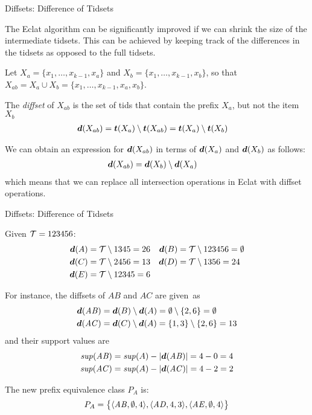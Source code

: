 \begin{frame}{Diffsets: Difference of Tidsets}

The Eclat algorithm can be
signif\/{i}cantly improved if we can shrink the size of the
intermediate tidsets. This can be achieved by keeping track of the
differences in the tidsets as opposed to the full tidsets.

\medskip
Let $X_a = \{x_1, \ldots, x_{k-1}, x_a\}$
and $X_b = \{x_1, \ldots, x_{k-1}, x_b\}$, so that
$X_{ab} = X_a \cup X_b = \{x_1, \ldots, x_{k-1}, x_a,
x_b \}$. 

\medskip
The {\em diffset} of $X_{ab}$ is the set of tids
that contain the pref\/{i}x $X_a$, but not
the item $X_b$
\begin{align*}
  {\boldsymbol d}(X_{ab}) &= {{\boldsymbol t}}(X_{a}) \setminus {{\boldsymbol t}}(X_{ab}) =
    {{\boldsymbol t}}(X_{a}) \setminus {{\boldsymbol t}}(X_{b})
\end{align*}

\medskip
We can obtain an expression for ${\boldsymbol d}(X_{ab})$ in terms of
${\boldsymbol d}(X_a)$ and ${\boldsymbol d}(X_b)$ as follows:
\begin{align*}
  {\boldsymbol d}(X_{ab}) 
    & = {\boldsymbol d}(X_b) \setminus {\boldsymbol d}(X_a)
\end{align*}
which means that we can replace all
intersection operations in Eclat with diffset operations. 

\end{frame}


\begin{frame}{Diffsets: Difference of Tidsets}

  Given ${\mathcal T} = 123456$:
  \begin{align*}
	  {\boldsymbol d}(A) & = {\mathcal T} \setminus 1345 = 26 & {\boldsymbol d}(B) & = {\mathcal T} \setminus 123456 = \emptyset\\
	  {\boldsymbol d}(C) & = {\mathcal T} \setminus 2456 = 13 & {\boldsymbol d}(D) & = {\mathcal T} \setminus 1356 = 24\\
	  {\boldsymbol d}(E) & = {\mathcal T} \setminus 12345 = 6 & & \\
  \end{align*}

  For instance, the diffsets of $\mathit{AB}$ and $\mathit{AC}$ are given~as
  \begin{align*}
  {\boldsymbol d}(\mathit{AB}) & = {\boldsymbol d}(B) \setminus {\boldsymbol d}(A)
  = \emptyset \setminus \{2,6\} =   \emptyset\\
  {\boldsymbol d}(\mathit{AC}) & = {\boldsymbol d}(C) \setminus {\boldsymbol d}(A) = \{1,3\} \setminus \{2,6\} = 13
  \end{align*}
  and their support values are
  \begin{align*}
    \mathit{sup}(\mathit{AB}) &= \mathit{sup}(A) - |{\boldsymbol d}(\mathit{AB})| = 4-0 = 4\\
    \mathit{sup}(\mathit{AC}) &= \mathit{sup}(A) - |{\boldsymbol d}(\mathit{AC})| = 4-2 = 2
  \end{align*}

  The new pref\/{i}x equivalence class $P_A$ is:
  $$P_A = \bigl\{ \langle \mathit{AB},\emptyset,4 \rangle, \langle \mathit{AD}, 4, 3 \rangle,
  \langle \mathit{AE}, \emptyset, 4 \rangle\bigr\}$$

\end{frame}


